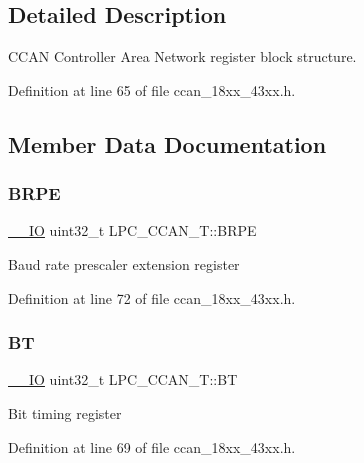 \subsection{Detailed Description}
C\+C\+AN Controller Area Network register block structure. 

Definition at line 65 of file ccan\+\_\+18xx\+\_\+43xx.\+h.



\subsection{Member Data Documentation}
\mbox{\label{struct_l_p_c___c_c_a_n___t_a4b6f8102fc95679c7f5f2eaf67a02b70}} 
\subsubsection{\texorpdfstring{B\+R\+PE}{BRPE}}
{\footnotesize\ttfamily \hyperlink{core__sc300_8h_aec43007d9998a0a0e01faede4133d6be}{\+\_\+\+\_\+\+IO} uint32\+\_\+t L\+P\+C\+\_\+\+C\+C\+A\+N\+\_\+\+T\+::\+B\+R\+PE}

Baud rate prescaler extension register 

Definition at line 72 of file ccan\+\_\+18xx\+\_\+43xx.\+h.

\mbox{\label{struct_l_p_c___c_c_a_n___t_afe3aeceae362d0a45f12f2ef602aa775}} 
\subsubsection{\texorpdfstring{BT}{BT}}
{\footnotesize\ttfamily \hyperlink{core__sc300_8h_aec43007d9998a0a0e01faede4133d6be}{\+\_\+\+\_\+\+IO} uint32\+\_\+t L\+P\+C\+\_\+\+C\+C\+A\+N\+\_\+\+T\+::\+BT}

Bit timing register 

Definition at line 69 of file ccan\+\_\+18xx\+\_\+43xx.\+h.

\mbox{\label{struct_l_p_c___c_c_a_n___t_abc7709e166110590f8f0a1df263948ce}} 
